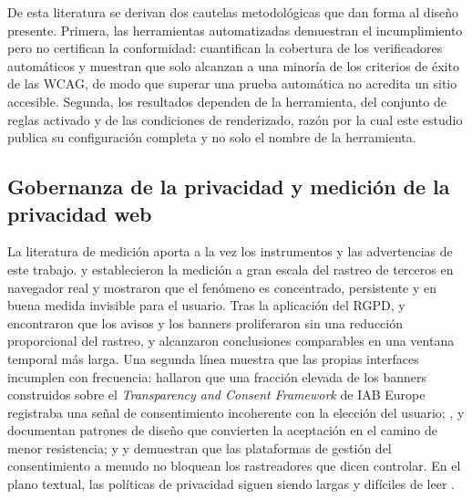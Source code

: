 \documentclass[pdflatex,sn-basic,Numbered]{sn-jnl}
\theoremstyle{thmstyleone}
\theoremstyle{thmstyletwo}
\theoremstyle{thmstylethree}
\begin{document}
De esta literatura se derivan dos cautelas metodol\'ogicas que dan forma al dise\~no presente. Primera, las herramientas automatizadas demuestran el incumplimiento pero no certifican la conformidad: \citet{fischer2025coverage} cuantifican la cobertura de los verificadores autom\'aticos y muestran que solo alcanzan a una minor\'ia de los criterios de \'exito de las WCAG, de modo que superar una prueba autom\'atica no acredita un sitio accesible. Segunda, los resultados dependen de la herramienta, del conjunto de reglas activado y de las condiciones de renderizado, raz\'on por la cual este estudio publica su configuraci\'on completa y no solo el nombre de la herramienta.

\subsection{Gobernanza de la privacidad y medici\'on de la privacidad web}\label{sec:related-privacy}

La literatura de medici\'on aporta a la vez los instrumentos y las advertencias de este trabajo. \citet{libert2015exposing} y \citet{englehardt2016online} establecieron la medici\'on a gran escala del rastreo de terceros en navegador real y mostraron que el fen\'omeno es concentrado, persistente y en buena medida invisible para el usuario. Tras la aplicaci\'on del RGPD, \citet{degeling2019value} y \citet{trevisan2019four} encontraron que los avisos y los banners proliferaron sin una reducci\'on proporcional del rastreo, y \citet{kretschmer2021cookie} alcanzaron conclusiones comparables en una ventana temporal m\'as larga. Una segunda l\'inea muestra que las propias interfaces incumplen con frecuencia: \citet{matte2020cookie} hallaron que una fracci\'on elevada de los banners construidos sobre el \emph{Transparency and Consent Framework} de IAB Europe registraba una se\~nal de consentimiento incoherente con la elecci\'on del usuario; \citet{nouwens2020dark}, \citet{gray2021dark} y \citet{habib2022okay} documentan patrones de dise\~no que convierten la aceptaci\'on en el camino de menor resistencia; y \citet{sanchezrola2019can} y \citet{bollinger2022automating} demuestran que las plataformas de gesti\'on del consentimiento a menudo no bloquean los rastreadores que dicen controlar. En el plano textual, las pol\'iticas de privacidad siguen siendo largas y dif\'iciles de leer \citep{fabian2017largescale,belcheva2023understanding}.
\end{document}
